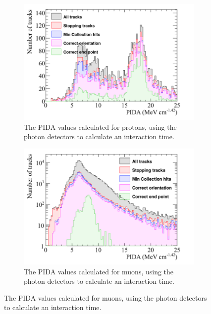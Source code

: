\begin{figure}
  \centering
  \begin{subfigure}{0.48\textwidth}
        \centering
        \includegraphics[width=\textwidth]{ProtonEnrich_500V_v05_14_00_trackpmtrackT0_MinTrCut_Proton_PIDA}
        \caption{The PIDA values calculated for protons, using the photon detectors to calculate an interaction time.}
        \label{fig:CRY_PIDACuts_Proton_NonCheat}
  \end{subfigure}%
  \hspace{0.03\textwidth}%
  \begin{subfigure}{0.48\textwidth}
        \centering
        \includegraphics[width=\textwidth]{ProtonEnrich_500V_v05_14_00_trackpmtrackT0_MinTrCut_Muon_PIDA}
        \caption{The PIDA values calculated for muons, using the photon detectors to calculate an interaction time.}

\end{subfigure}
\end{figure}
